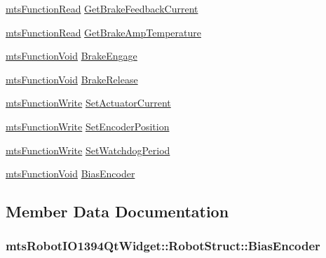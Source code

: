 \begin{DoxyCompactItemize}
\item 
\hyperlink{classmts_function_read}{mts\+Function\+Read} \hyperlink{structmts_robot_i_o1394_qt_widget_1_1_robot_struct_a86d4ca78e3c09b3ccba249bb2f0e98a1}{Get\+Brake\+Feedback\+Current}
\item 
\hyperlink{classmts_function_read}{mts\+Function\+Read} \hyperlink{structmts_robot_i_o1394_qt_widget_1_1_robot_struct_ac0a6317c6dd629a624943a7188cbd6f1}{Get\+Brake\+Amp\+Temperature}
\item 
\hyperlink{classmts_function_void}{mts\+Function\+Void} \hyperlink{structmts_robot_i_o1394_qt_widget_1_1_robot_struct_a78c8e3e577e97996959ab894ae1086ff}{Brake\+Engage}
\item 
\hyperlink{classmts_function_void}{mts\+Function\+Void} \hyperlink{structmts_robot_i_o1394_qt_widget_1_1_robot_struct_aa3bf0be8a4f616069a7e034c75a6d635}{Brake\+Release}
\item 
\hyperlink{classmts_function_write}{mts\+Function\+Write} \hyperlink{structmts_robot_i_o1394_qt_widget_1_1_robot_struct_a4a42aa88af8c06697fe9331bb6889dc0}{Set\+Actuator\+Current}
\item 
\hyperlink{classmts_function_write}{mts\+Function\+Write} \hyperlink{structmts_robot_i_o1394_qt_widget_1_1_robot_struct_a70dc86de257b6f14358323f985f07b8a}{Set\+Encoder\+Position}
\item 
\hyperlink{classmts_function_write}{mts\+Function\+Write} \hyperlink{structmts_robot_i_o1394_qt_widget_1_1_robot_struct_a596d925a30141dfde20884ed7a778f42}{Set\+Watchdog\+Period}
\item 
\hyperlink{classmts_function_void}{mts\+Function\+Void} \hyperlink{structmts_robot_i_o1394_qt_widget_1_1_robot_struct_a7eb8ab9780edc452f89022eb19d3a4be}{Bias\+Encoder}
\end{DoxyCompactItemize}


\subsection{Member Data Documentation}
\hypertarget{structmts_robot_i_o1394_qt_widget_1_1_robot_struct_a7eb8ab9780edc452f89022eb19d3a4be}{}
\subsubsection[{Bias\+Encoder}]{ mts\+Robot\+I\+O1394\+Qt\+Widget\+::\+Robot\+Struct\+::\+Bias\+Encoder}\label{structmts_robot_i_o1394_qt_widget_1_1_robot_struct_a7eb8ab9780edc452f89022eb19d3a4be}
\hypertarget{structmts_robot_i_o1394_qt_widget_1_1_robot_struct_a78c8e3e577e97996959ab894ae1086ff}{}
